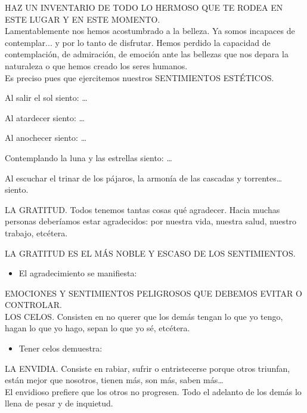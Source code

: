\documentclass[10pt,twoside]{article}
\begin{document}
HAZ UN INVENTARIO DE TODO LO HERMOSO QUE TE RODEA EN ESTE
LUGAR Y EN ESTE MOMENTO.\\
Lamentablemente nos hemos acostumbrado a la belleza. Ya somos incapaces de contemplar... y por lo tanto de disfrutar. Hemos perdido la capacidad de contemplación, de admiración, de emoción ante las bellezas que nos depara la naturaleza o que hemos creado los seres humanos.\\
Es preciso pues que ejercitemos nuestros SENTIMIENTOS ESTÉTICOS.
\begin{itemize}\begin{multicols}{2}
  \item Al salir el sol siento: \ldots
  \item Al atardecer siento: \ldots
  \item Al anochecer siento: \ldots
  \item Contemplando la luna y las estrellas siento: \ldots 
  \item Al escuchar el trinar de los pájaros, la armonía de las cascadas y torrentes\ldots siento.\end{multicols}
\end{itemize}
LA GRATITUD. Todos tenemos tantas cosas qué agradecer. Hacia muchas personas deberíamos estar agradecidos: por nuestra vida, nuestra salud, nuestro trabajo, etcétera.
\begin{center}
LA GRATITUD ES EL MÁS NOBLE Y ESCASO DE LOS SENTIMIENTOS.
\end{center}
\begin{itemize}
  \item El agradecimiento se manifiesta:
\end{itemize}
EMOCIONES Y SENTIMIENTOS PELIGROSOS QUE DEBEMOS EVITAR O
CONTROLAR.\\
LOS CELOS. Consisten en no querer que los demás tengan lo que yo tengo, hagan lo que yo hago, sepan lo que yo sé, etcétera.
\begin{itemize}
  \item Tener celos demuestra:
\end{itemize}
LA ENVIDIA. Consiste en rabiar, sufrir o entristecerse porque otros triunfan, están mejor que nosotros, tienen más, son más, saben más\ldots\\
El envidioso prefiere que los otros no progresen. Todo el adelanto de los demás lo llena de pesar y de inquietud.\\
\end{document}
